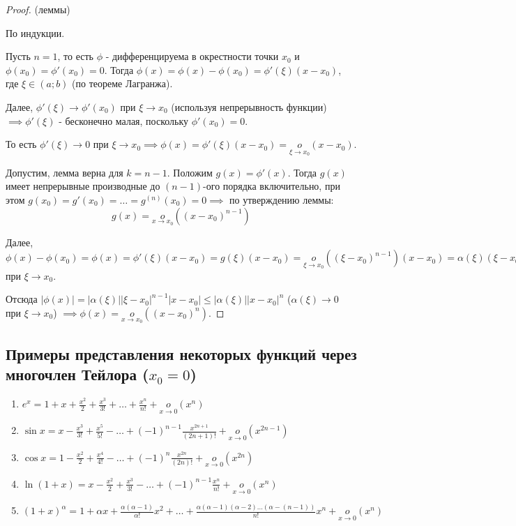\documentclass{report}
\theoremstyle{definition}
\begin{document}
\clearpage

\begin{proof}
  (леммы)

  По индукции.

  Пусть $n = 1$, то есть $\phi$ - дифференцируема в окрестности точки $x_0$ и $\phi(x_0)
    = \phi'(x_0) = 0$. Тогда $\phi(x) = \phi(x) - \phi(x_0) = \phi'(\xi)(x-x_0)$, где $\xi\in(a;b)$
  (по теореме Лагранжа).

  Далее, $\phi'(\xi)\rightarrow\phi'(x_0)$ при $\xi\rightarrow x_0$ (используя непрерывность функции)
  $\implies \phi'(\xi)$ - бесконечно малая, поскольку $\phi'(x_0) = 0$.

  То есть $\phi'(\xi)\rightarrow0$ при $\xi\rightarrow x_0 \implies \phi(x) = \phi'(\xi)(x-x_0) =
    \underset{\xi\rightarrow x_0}{o}(x-x_0)$.

  Допустим, лемма верна для $k=n-1$. Положим $g(x) = \phi'(x)$. Тогда $g(x)$ имеет непрерывные производные
  до $(n-1)$-ого порядка включительно, при этом $g(x_0) = g'(x_0) = \ldots = g^{(n)}(x_0) = 0 \implies$
  по утверждению леммы:
  \begin{equation*}
    g(x) = \underset{x\rightarrow x_0}{o}((x-x_0)^{n-1})
  \end{equation*}

  Далее, $\phi(x) - \phi(x_0) = \phi(x) = \phi'(\xi)(x-x_0) = g(\xi)(x-x_0) = \underset{\xi\rightarrow x_0}
    {o}((\xi - x_0)^{n-1})(x-x_0) = \alpha(\xi)(\xi - x_0)^{n-1}(x-x_0), \ \alpha(\xi)\rightarrow 0$ при
  $\xi \rightarrow x_0$.

  Отсюда $| \phi(x) | = | \alpha(\xi) | | \xi - x_0 |^{n-1} | x - x_0 | \leqslant | \alpha (\xi) |
    | x - x_0 |^n$ ($\alpha (\xi) \rightarrow0$ при $\xi \rightarrow x_0$) $\implies \phi(x) = \underset
    {x\rightarrow x_0}{o}((x-x_0)^n)$.
\end{proof}

\subsection*{Примеры представления некоторых функций через многочлен Тейлора ($x_0 = 0$)}

\begin{enumerate}
  \item $e^x = 1 + x + \frac{x^2}{2} + \frac{x^3}{3!} + \ldots + \frac{x^n}{n!} + \underset{x\rightarrow0}
          {o}(x^n)$
  \item $\sin x = x - \frac{x^3}{3!} + \frac{x^5}{5!} - \ldots + (-1)^{n-1}\frac{x^{2n+1}}{(2n+1)!} +
          \underset{x\rightarrow0}{o}(x^{2n-1})$
  \item $\cos x = 1 - \frac{x^2}{2} + \frac{x^4}{4!} - \ldots + (-1)^n\frac{x^{2n}}{(2n)!} +
          \underset{x\rightarrow0}{o}(x^{2n})$
  \item $\ln (1+x) = x - \frac{x^2}{2} + \frac{x^3}{3!} - \ldots + (-1)^{n-1}\frac{x^n}{n!} +
          \underset{x\rightarrow0}{o}(x^n)$
  \item $(1+x)^\alpha = 1 + \alpha x + \frac{\alpha (\alpha - 1)}{\alpha !} x^2 + \ldots +
          \frac{\alpha(\alpha-1)(\alpha-2)\ldots(\alpha - (n-1))}{n!}x^n + \underset{x\rightarrow0}{o}(x^n)$
\end{enumerate}
\end{document}
